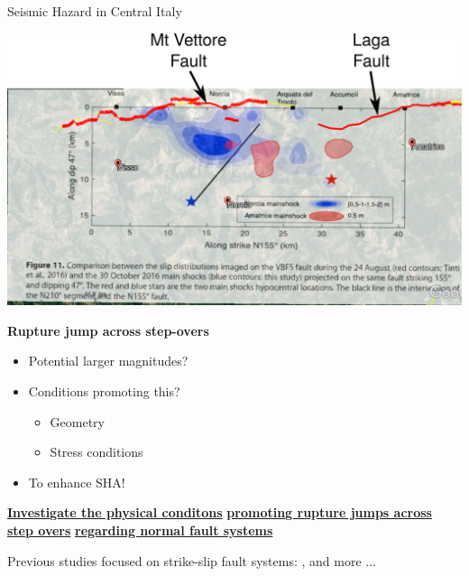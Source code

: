 \documentclass{beamer}
\begin{document}
\begin{frame}
 {Seismic Hazard in Central Italy}
 
 \begin{minipage}{0.45\linewidth}
  \includegraphics[width=1\linewidth]{images/amatrice_1.pdf}
 \end{minipage}
 \begin{minipage}{0.52\linewidth}
  {\bf Rupture jump across step-overs}
  \begin{itemize}
   \footnotesize \item \footnotesize Potential larger magnitudes?
   \vskip 0.3cm
   \item \footnotesize Conditions promoting this?
   \begin{itemize}
   \vskip 0.3cm
    \item \footnotesize Geometry
    \item \footnotesize Stress conditions
   \end{itemize}
   \vskip 0.3cm
   \item \footnotesize To enhance SHA!
  \end{itemize}
 \end{minipage}

 \begin{center}
 \vskip 0.3cm
   \underline{\bf \small Investigate the physical conditons}
   \underline{\bf \small promoting rupture jumps across step overs} 
   \underline{\bf \small regarding normal fault systems} 
  \vskip 0.3cm
  
 \end{center}
 {\scriptsize Previous studies focused on strike-slip fault systems: \cite{Galis_2015_ISS,Hu_2016_IEJ,Bai_2017_ESD,Li_2020_ERT,Oglesby_2008_RTJ}, and more ... } 
 \addtocounter{framenumber}{-1}
 
\end{frame}
\end{document}
